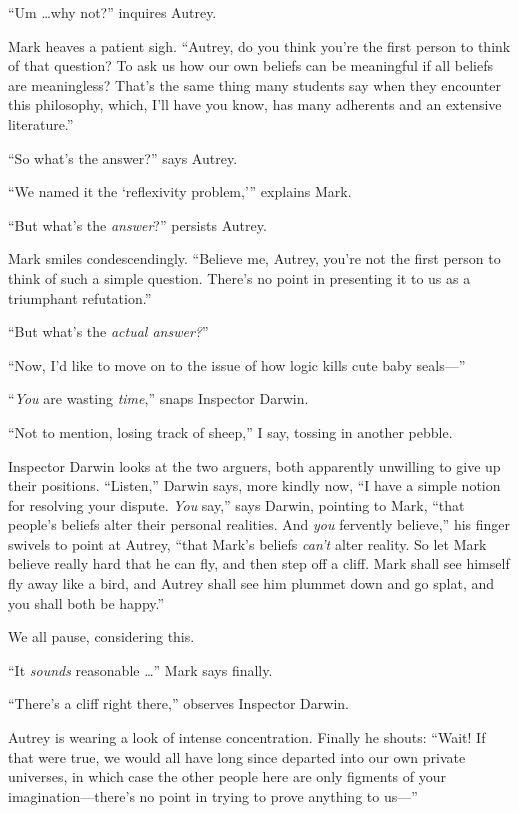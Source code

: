 {
 ``Um \ldots why not?'' inquires
Autrey.}

{
 Mark heaves a patient sigh. ``Autrey, do you
think you're the first person to think of that
question? To ask us how our own beliefs can be meaningful if all
beliefs are meaningless? That's the same thing many
students say when they encounter this philosophy, which,
I'll have you know, has many adherents and an extensive
literature.''}

{
 ``So what's the
answer?'' says Autrey.}

{
 ``We named it the `reflexivity
problem,''' explains Mark.}

{
 ``But what's the
\textit{answer}?'' persists Autrey.}

{
 Mark smiles condescendingly. ``Believe me,
Autrey, you're not the first person to think of such a
simple question. There's no point in presenting it to
us as a triumphant refutation.''}

{
 ``But what's the \textit{actual
answer?}''}

{
 ``Now, I'd like to move on to the
issue of how logic kills cute baby seals---''}

{
 ``\textit{You} are wasting
\textit{time},'' snaps Inspector Darwin.}

{
 ``Not to mention, losing track of
sheep,'' I say, tossing in another pebble.}

{
 Inspector Darwin looks at the two arguers, both apparently
unwilling to give up their positions.
``Listen,'' Darwin says, more kindly
now, ``I have a simple notion for resolving your
dispute. \textit{You} say,'' says Darwin, pointing to
Mark, ``that people's beliefs alter
their personal realities. And \textit{you} fervently
believe,'' his finger swivels to point at Autrey,
``that Mark's beliefs
\textit{can't} alter reality. So let Mark believe
really hard that he can fly, and then step off a cliff. Mark shall see
himself fly away like a bird, and Autrey shall see him plummet down and
go splat, and you shall both be happy.''}

{
 We all pause, considering this.}

{
 ``It \textit{sounds} reasonable
\ldots'' Mark says finally.}

{
 ``There's a cliff right
there,'' observes Inspector Darwin.}

{
 Autrey is wearing a look of intense concentration. Finally he
shouts: ``Wait! If that were true, we would all have
long since departed into our own private universes, in which case the
other people here are only figments of your
imagination---there's no point in trying to prove
anything to us---''}

